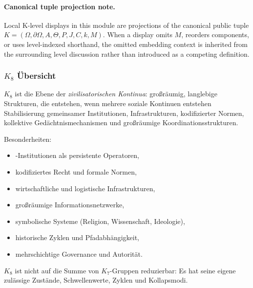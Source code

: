 



\paragraph{Canonical tuple projection note.}
Local K-level displays in this module are projections of the canonical public tuple \(K=(\Omega,\partial\Omega,A,\Theta,P,J,C,k,M)\). When a display omits \(M\), reorders components, or uses level-indexed shorthand, the omitted embedding context is inherited from the surrounding level discussion rather than introduced as a competing definition.

\subsubsection{\texorpdfstring{$K_8$}{K_8} Übersicht}
\label{sec:k8-overview}

$K_8$ ist die Ebene der \emph{zivilisatorischen Kontinua}: großräumig,
langlebige Strukturen, die entstehen, wenn mehrere soziale Kontinuen entstehen
Stabilisierung gemeinsamer Institutionen, Infrastrukturen, kodifizierter Normen,
kollektive Gedächtnismechanismen und großräumige Koordinationsstrukturen.

Besonderheiten:
\begin{itemize}
    \item-Institutionen als persistente Operatoren,
    \item kodifiziertes Recht und formale Normen,
    \item wirtschaftliche und logistische Infrastrukturen,
    \item großräumige Informationsnetzwerke,
    \item symbolische Systeme (Religion, Wissenschaft, Ideologie),
    \item historische Zyklen und Pfadabhängigkeit,
    \item mehrschichtige Governance und Autorität.
\end{itemize}

$K_8$ ist nicht auf die Summe von $K_7$-Gruppen reduzierbar: Es hat seine eigene
zulässige Zustände, Schwellenwerte, Zyklen und Kollapsmodi.

